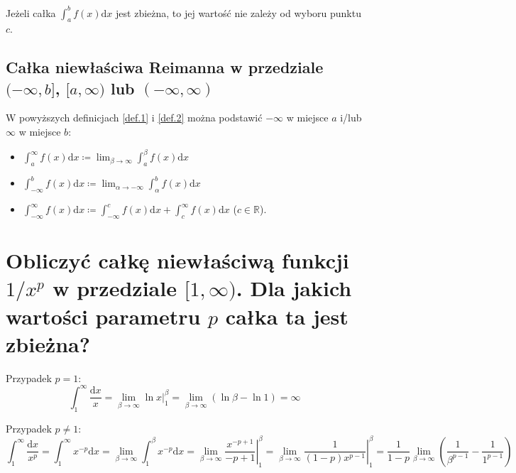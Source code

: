 \documentclass{article}
\theoremstyle{definition}
\theoremstyle{case}
\begin{document}
Jeżeli całka $\int_a^b f(x) \mathrm{d}x$ jest zbieżna, to jej wartość nie zależy od wyboru punktu $c$.

\subsection{Całka niewłaściwa Reimanna w przedziale
\texorpdfstring{$(-\infty,b]$}{(-inf,b]},
\texorpdfstring{$[a,\infty)$}{[a,+inf)} lub
	\texorpdfstring{$(-\infty,\infty)$}{(-inf,+inf)}
}
W powyższych definicjach \ref{def.1} i \ref{def.2} można podstawić $-\infty$ w miejsce $a$ i/lub $\infty$ w miejsce $b$:
\begin{itemize}
	\item
		$\int_a^{\infty} f(x) \mathrm{d}x
		\coloneqq
		\lim_{\beta \to \infty} \int_a^{\beta} f(x) \mathrm{d}x$
	\item
		$\int_{-\infty}^b f(x) \mathrm{d}x
		\coloneqq
		\lim_{\alpha \to -\infty} \int_{\alpha}^b f(x) \mathrm{d}x$
	\item
		$\int_{-\infty}^{\infty} f(x) \mathrm{d}x
		\coloneqq
		\int_{-\infty}^{c} f(x) \mathrm{d}x + \int_{c}^{\infty} f(x) \mathrm{d}x$ ($c \in \mathbb{R}$).
\end{itemize}

\section{Obliczyć całkę niewłaściwą funkcji
	\texorpdfstring{$ 1 / x^p $}{1/x\textasciicircum p}
	w przedziale
	\texorpdfstring{$ [ 1, \infty ) $}{[1,inf)}.
	Dla jakich wartości parametru $p$ całka ta jest zbieżna?}

	Przypadek $p=1$:
	\begin{equation*}
		\int_1^\infty \frac{\mathrm{d}x}{x}
		= \lim_{\beta \to \infty} \left. \ln x \right|_1^{\beta}
		= \lim_{\beta \to \infty} (\ln \beta -\ln 1)
		= \infty
	\end{equation*}

	Przypadek $p\neq 1$:
	\begin{equation*}
		\int_1^{\infty}\frac{\mathrm{d}x}{x^p}
		= \int_1^{\infty} x^{-p} \mathrm{d}x
		= \lim_{\beta \to \infty}\int_1^\beta x^{-p} \mathrm{d}x
		= \lim_{\beta \to \infty} \left. \frac{x^{-p+1}}{-p+1} \right|_1^\beta
		= \lim_{\beta \to \infty} \left. \frac{1}{(1-p)x^{p-1}} \right|_1^\beta
		= \frac{1}{1-p} \lim_{\beta \to \infty} \left( \frac{1}{\beta^{p-1}} - \frac{1}{1^{p-1}} \right)
	\end{equation*}
\end{document}
